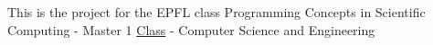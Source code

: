 This is the project for the E\+P\+FL class Programming Concepts in Scientific Computing -\/ Master 1 \mbox{\hyperlink{class_class}{Class}} -\/ Computer Science and Engineering 